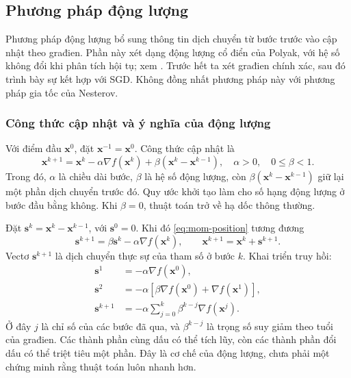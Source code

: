 \subsection{Phương pháp động lượng}
\label{sec:momentum}

Phương pháp động lượng bổ sung thông tin dịch chuyển từ bước trước vào
cập nhật theo građien. Phần này xét dạng động lượng cổ điển của Polyak,
với hệ số không đổi khi phân tích hội tụ; xem
\cite[Mục~7.1]{bottou2018optimization}. Trước hết ta xét građien chính xác,
sau đó trình bày sự kết hợp với SGD. Không đồng nhất phương pháp này
với phương pháp gia tốc của Nesterov.

\subsubsection{Công thức cập nhật và ý nghĩa của động lượng}

Với điểm đầu $\mathbf{x}^{0}$, đặt $\mathbf{x}^{-1}=\mathbf{x}^{0}$.
Công thức cập nhật là
\begin{equation}
 \boxed{\mathbf{x}^{k+1}=\mathbf{x}^{k}-\alpha\nabla f(\mathbf{x}^{k})
                     +\beta(\mathbf{x}^{k}-\mathbf{x}^{k-1}),}
 \quad \alpha>0,\quad 0\leq\beta<1.
 \label{eq:mom-position}
\end{equation}
Trong đó, $\alpha$ là chiều dài bước, $\beta$ là hệ số động lượng, còn
$\beta(\mathbf{x}^{k}-\mathbf{x}^{k-1})$ giữ lại một phần dịch chuyển
trước đó. Quy ước khởi tạo làm cho số hạng động lượng ở bước đầu bằng
không. Khi $\beta=0$, thuật toán trở về hạ dốc thông thường.

Đặt $\mathbf{s}^{k}=\mathbf{x}^{k}-\mathbf{x}^{k-1}$, với
$\mathbf{s}^{0}=0$. Khi đó \eqref{eq:mom-position} tương đương
\begin{equation}
 \mathbf{s}^{k+1}=\beta\mathbf{s}^{k}-\alpha\nabla f(\mathbf{x}^{k}),
 \qquad \mathbf{x}^{k+1}=\mathbf{x}^{k}+\mathbf{s}^{k+1}.
 \label{eq:mom-displacement}
\end{equation}
Vectơ $\mathbf{s}^{k+1}$ là dịch chuyển thực sự của tham số ở bước $k$.
Khai triển truy hồi:
\begin{align*}
 \mathbf{s}^{1}&=-\alpha\nabla f(\mathbf{x}^{0}),\\
 \mathbf{s}^{2}&=-\alpha\left[
             \beta\nabla f(\mathbf{x}^{0})+\nabla f(\mathbf{x}^{1})\right],\\
 \mathbf{s}^{k+1}&=-\alpha\sum_{j=0}^{k}
                           \beta^{k-j}\nabla f(\mathbf{x}^{j}).
\end{align*}
Ở đây $j$ là chỉ số của các bước đã qua, và $\beta^{k-j}$ là trọng số
suy giảm theo tuổi của građien. Các thành phần cùng dấu có thể tích lũy,
còn các thành phần đổi dấu có thể triệt tiêu một phần. Đây là cơ chế
của động lượng, chưa phải một chứng minh rằng thuật toán luôn nhanh hơn.

